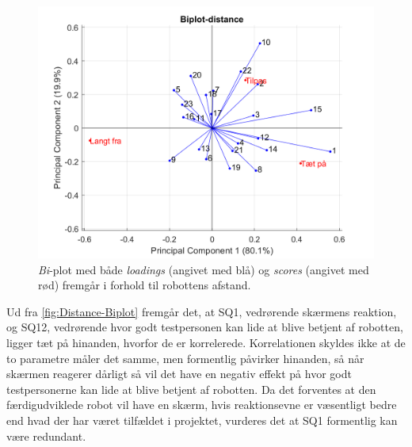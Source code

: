 %
\begin{figure}[H]
\centering
\includegraphics[width=\textwidth]{Figure/DatabehandlingSkalaer/PCAfigures/Distance-Biplot.png}
\caption{\textit{Bi}-plot med både \textit{loadings} (angivet med blå) og \textit{scores} (angivet med rød) fremgår i forhold til robottens afstand.}
\label{fig:Distance-Biplot}
\end{figure}
\noindent
%
Ud fra \autoref{fig:Distance-Biplot} fremgår det, at SQ1, vedrørende skærmens reaktion, og SQ12, vedrørende hvor godt testpersonen kan lide at blive betjent af robotten, ligger tæt på hinanden, hvorfor de er korrelerede. Korrelationen skyldes ikke at de to parametre måler det samme, men formentlig påvirker hinanden, så når skærmen reagerer dårligt så vil det have en negativ effekt på hvor godt testpersonerne kan lide at blive betjent af robotten. Da det forventes at den færdigudviklede robot vil have en skærm, hvis reaktionsevne er væsentligt bedre end hvad der har været tilfældet i projektet, vurderes det at SQ1 formentlig kan være redundant. 

